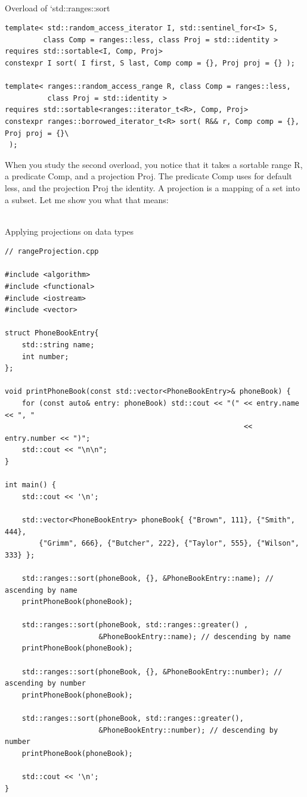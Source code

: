 \hspace*{\fill} \\ %
\noindent
Overload of ‘std::ranges::sort
\begin{lstlisting}[style=styleCXX]
template< std::random_access_iterator I, std::sentinel_for<I> S,
         class Comp = ranges::less, class Proj = std::identity >
requires std::sortable<I, Comp, Proj>
constexpr I sort( I first, S last, Comp comp = {}, Proj proj = {} );

template< ranges::random_access_range R, class Comp = ranges::less,
          class Proj = std::identity >
requires std::sortable<ranges::iterator_t<R>, Comp, Proj>
constexpr ranges::borrowed_iterator_t<R> sort( R&& r, Comp comp = {}, Proj proj = {}\
 );
\end{lstlisting}

When you study the second overload, you notice that it takes a sortable range R, a predicate Comp, and a projection Proj. The predicate Comp uses for default less, and the projection Proj the identity. A projection is a mapping of a set into a subset. Let me show you what that means:

\hspace*{\fill} \\ %
\noindent
Applying projections on data types
\begin{lstlisting}[style=styleCXX]
// rangeProjection.cpp

#include <algorithm>
#include <functional>
#include <iostream>
#include <vector>

struct PhoneBookEntry{
	std::string name;
	int number;
};

void printPhoneBook(const std::vector<PhoneBookEntry>& phoneBook) {
	for (const auto& entry: phoneBook) std::cout << "(" << entry.name << ", "
	                                                    << entry.number << ")";
	std::cout << "\n\n";
}

int main() {
	std::cout << '\n';
	
	std::vector<PhoneBookEntry> phoneBook{ {"Brown", 111}, {"Smith", 444},
		{"Grimm", 666}, {"Butcher", 222}, {"Taylor", 555}, {"Wilson", 333} };
	
	std::ranges::sort(phoneBook, {}, &PhoneBookEntry::name); // ascending by name
	printPhoneBook(phoneBook);
	
	std::ranges::sort(phoneBook, std::ranges::greater() ,
	                  &PhoneBookEntry::name); // descending by name
	printPhoneBook(phoneBook);
	
	std::ranges::sort(phoneBook, {}, &PhoneBookEntry::number); // ascending by number
	printPhoneBook(phoneBook);
	
	std::ranges::sort(phoneBook, std::ranges::greater(),
	                  &PhoneBookEntry::number); // descending by number
	printPhoneBook(phoneBook);
	
	std::cout << '\n';
}
\end{lstlisting}

